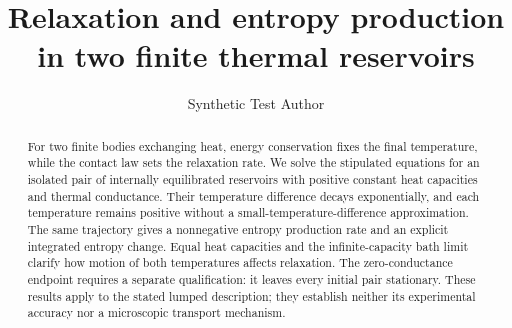 \documentclass[aps,prx,reprint,groupedaddress]{revtex4-2}
\begin{document}
\title{Relaxation and entropy production in two finite thermal reservoirs}
\author{Synthetic Test Author}
\noaffiliation
\begin{abstract}
For two finite bodies exchanging heat, energy conservation fixes the final temperature, while the contact law sets the relaxation rate. We solve the stipulated equations for an isolated pair of internally equilibrated reservoirs with positive constant heat capacities and thermal conductance. Their temperature difference decays exponentially, and each temperature remains positive without a small-temperature-difference approximation. The same trajectory gives a nonnegative entropy production rate and an explicit integrated entropy change. Equal heat capacities and the infinite-capacity bath limit clarify how motion of both temperatures affects relaxation. The zero-conductance endpoint requires a separate qualification: it leaves every initial pair stationary. These results apply to the stated lumped description; they establish neither its experimental accuracy nor a microscopic transport mechanism.
\end{abstract}
\maketitle







\appendix


\end{document}
